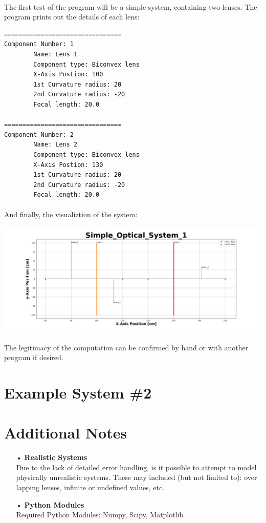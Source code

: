 \documentclass[12pt,letterpaper]{article}
\begin{document}
\paragraph*{}The first test of the program will be a simple system, containing two lenses. The program prints out the details of each lens:
\begin{verbatim}
================================
Component Number: 1
        Name: Lens 1
        Component type: Biconvex lens
        X-Axis Postion: 100
        1st Curvature radius: 20
        2nd Curvature radius: -20
        Focal length: 20.0

================================
Component Number: 2
        Name: Lens 2
        Component type: Biconvex lens
        X-Axis Postion: 130
        1st Curvature radius: 20
        2nd Curvature radius: -20
        Focal length: 20.0
\end{verbatim}
\paragraph*{}And finally, the visualiztion of the system:
\begin{center}
\includegraphics[scale=0.3]{Simple_Optical_System_1}
\end{center}
\paragraph*{}The legitimacy of the computation can be confirmed by hand or with another program if desired.


\section{Example System \#2}


\section{Additional Notes}
\begin{itemize}
\item[•]\textbf{Realistic Systems}\\
Due to the lack of detailed error handling, is it possible to attempt to model physically unrealistic systems. These may included (but not limited to): over lapping lenses, infinite or undefined values, etc.
\item[•]\textbf{Python Modules}\\
Required Python Modules: Numpy, Scipy, Matplotlib
\end{itemize}
\end{document}
